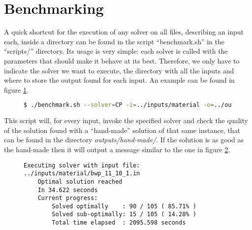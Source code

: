 \section{Benchmarking}
\label{sec:benchmarking}

A quick shortcut for the execution of any solver on all files, describing
an input each, inside a directory can be found in the script ``benchmark.sh''
in the ``scripts/'' directory. Its usage is very simple: each solver is
called with the parameters that should make it behave at its best. Therefore,
we only have to indicate the solver we want to execute, the directory with
all the inputs and where to store the output found for each input. An example
can be found in figure \ref{fig:benchmark-example}.

\begin{figure}[H]
\centering
\begin{lstlisting}[language=bash,basicstyle=\centering]
$ ./benchmark.sh --solver=CP -i=../inputs/material -o=../outputs/CP
\end{lstlisting}
\label{fig:benchmark-example}
\end{figure}

This script will, for every input, invoke the specified solver and check the
quality of the solution found with a ``hand-made'' solution of that same
instance, that can be found in the directory \textit{outputs/hand-made/}. If the
solution is as good as the hand-made then it will output a message
similar to the one in figure \ref{fig:benchmark-verbose:optimal}.

\begin{figure}[H]
\centering
{\scriptsize
\begin{BVerbatim}
Executing solver with input file: ../inputs/material/bwp_11_10_1.in
    Optimal solution reached
    In 34.622 seconds
    Current progress:
        Solved optimally    : 90 / 105 ( 85.71%
        Solved sub-optimally: 15 / 105 ( 14.28%
        Total time elapsed  : 2095.598 seconds
\end{BVerbatim}
}
\label{fig:benchmark-verbose:optimal}
\end{figure}

